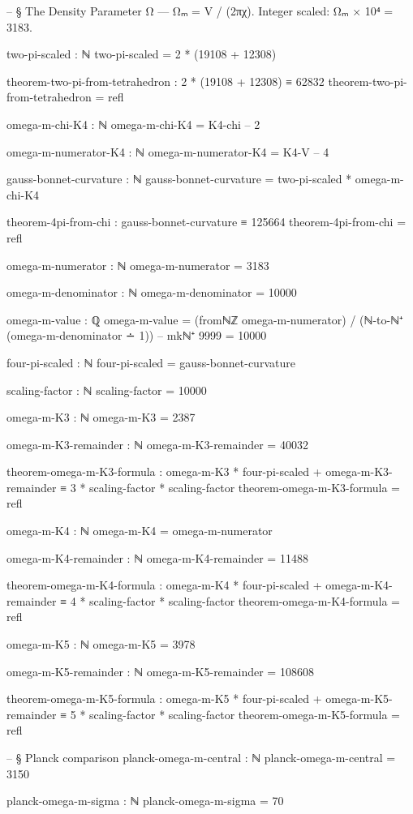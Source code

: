 \documentclass[11pt,a4paper]{book}
\begin{document}
\begin{code}
-- § The Density Parameter Ω — Ωₘ = V / (2πχ). Integer scaled: Ωₘ × 10⁴ = 3183.

two-pi-scaled : ℕ
two-pi-scaled = 2 * (19108 + 12308)

theorem-two-pi-from-tetrahedron : 2 * (19108 + 12308) ≡ 62832
theorem-two-pi-from-tetrahedron = refl

omega-m-chi-K4 : ℕ
omega-m-chi-K4 = K4-chi  -- 2

omega-m-numerator-K4 : ℕ
omega-m-numerator-K4 = K4-V  -- 4

gauss-bonnet-curvature : ℕ
gauss-bonnet-curvature = two-pi-scaled * omega-m-chi-K4

theorem-4pi-from-chi : gauss-bonnet-curvature ≡ 125664
theorem-4pi-from-chi = refl

omega-m-numerator : ℕ
omega-m-numerator = 3183

omega-m-denominator : ℕ
omega-m-denominator = 10000

omega-m-value : ℚ
omega-m-value = (fromℕℤ omega-m-numerator) / (ℕ-to-ℕ⁺ (omega-m-denominator ∸ 1))  -- mkℕ⁺ 9999 = 10000

four-pi-scaled : ℕ
four-pi-scaled = gauss-bonnet-curvature

scaling-factor : ℕ
scaling-factor = 10000

omega-m-K3 : ℕ
omega-m-K3 = 2387

omega-m-K3-remainder : ℕ
omega-m-K3-remainder = 40032

theorem-omega-m-K3-formula : omega-m-K3 * four-pi-scaled + omega-m-K3-remainder ≡ 3 * scaling-factor * scaling-factor
theorem-omega-m-K3-formula = refl

omega-m-K4 : ℕ
omega-m-K4 = omega-m-numerator

omega-m-K4-remainder : ℕ
omega-m-K4-remainder = 11488

theorem-omega-m-K4-formula : omega-m-K4 * four-pi-scaled + omega-m-K4-remainder ≡ 4 * scaling-factor * scaling-factor
theorem-omega-m-K4-formula = refl

omega-m-K5 : ℕ
omega-m-K5 = 3978

omega-m-K5-remainder : ℕ
omega-m-K5-remainder = 108608

theorem-omega-m-K5-formula : omega-m-K5 * four-pi-scaled + omega-m-K5-remainder ≡ 5 * scaling-factor * scaling-factor
theorem-omega-m-K5-formula = refl

-- § Planck comparison
planck-omega-m-central : ℕ
planck-omega-m-central = 3150

planck-omega-m-sigma : ℕ
planck-omega-m-sigma = 70


\end{code}
\end{document}
